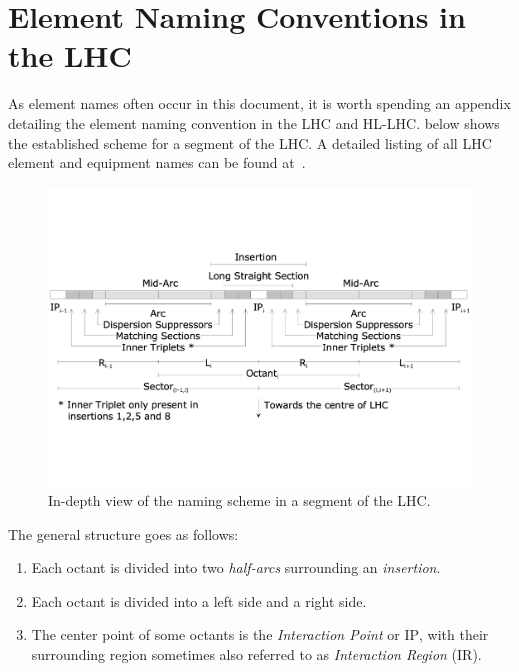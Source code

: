\chapter{Element Naming Conventions in the LHC}
\label{appendix:naming_conventions}


As element names often occur in this document, it is worth spending an appendix detailing the element naming convention in the LHC and HL-LHC.
 below shows the established scheme for a segment of the LHC.
A detailed listing of all LHC element and equipment names can be found at~\cite{CERN:Equipment_Codes}.

\begin{figure}[h]
    \centering
    \includegraphics*[width=0.9\linewidth]{Figures/Appendices/LHC_naming_scheme.pdf}
    \caption{In-depth view of the naming scheme in a segment of the LHC.}
    \label{figure:lhc_segment_naming_scheme}
  \end{figure}

The general structure goes as follows:
\begin{enumerate}
    \item Each octant is divided into two \textit{half-arcs} surrounding an \textit{insertion}.
    \item Each octant is divided into a left side and a right side.
    \item The center point of some octants is the \textit{Interaction Point} or \(\mathrm{IP}\), with their surrounding region sometimes also referred to as \textit{Interaction Region} (\(\mathrm{IR}\)).
\end{enumerate}

